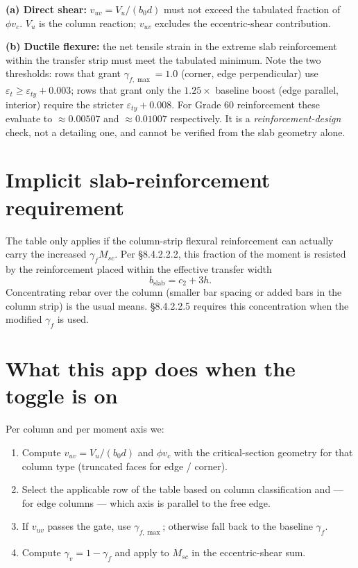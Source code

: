 \documentclass[10pt]{article}
\begin{document}
\vspace{3pt}
\noindent\textbf{(a) Direct shear:} $v_{uv} = V_u / (b_0 d)$ must not exceed the tabulated fraction of $\phi v_c$. $V_u$ is the column reaction; $v_{uv}$ excludes the eccentric-shear contribution.

\vspace{2pt}
\noindent\textbf{(b) Ductile flexure:} the net tensile strain in the extreme slab reinforcement within the transfer strip must meet the tabulated minimum. Note the two thresholds: rows that grant $\gamma_{f,\max} = 1.0$ (corner, edge perpendicular) use $\varepsilon_t \geq \varepsilon_{ty} + 0.003$; rows that grant only the $1.25\times$ baseline boost (edge parallel, interior) require the stricter $\varepsilon_{ty} + 0.008$. For Grade 60 reinforcement these evaluate to $\approx 0.00507$ and $\approx 0.01007$ respectively. It is a \textit{reinforcement-design} check, not a detailing one, and cannot be verified from the slab geometry alone.

\section*{Implicit slab-reinforcement requirement}
The table only applies if the column-strip flexural reinforcement can actually carry the increased $\gamma_f M_{sc}$. Per \S 8.4.2.2.2, this fraction of the moment is resisted by the reinforcement placed within the effective transfer width
\[
b_{\text{slab}} = c_2 + 3h.
\]
Concentrating rebar over the column (smaller bar spacing or added bars in the column strip) is the usual means. \S 8.4.2.2.5 requires this concentration when the modified $\gamma_f$ is used.

\section*{What this app does when the toggle is on}
Per column and per moment axis we:
\begin{enumerate}
\item Compute $v_{uv} = V_u / (b_0 d)$ and $\phi v_c$ with the critical-section geometry for that column type (truncated faces for edge / corner).
\item Select the applicable row of the table based on column classification and --- for edge columns --- which axis is parallel to the free edge.
\item If $v_{uv}$ passes the gate, use $\gamma_{f,\max}$; otherwise fall back to the baseline $\gamma_f$.
\item Compute $\gamma_v = 1 - \gamma_f$ and apply to $M_{sc}$ in the eccentric-shear sum.
\end{enumerate}
\end{document}
